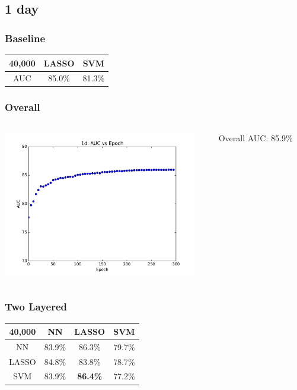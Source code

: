 \documentclass[table]{beamer}
\begin{document}

\subsection{1 day}

\begin{frame}
	\frametitle{Baseline}
	\begin{center}
		\begin{tabular}{c | c c}
			40,000 & LASSO & SVM \\ \hline
			AUC & 85.0\% & 81.3\% \\
		\end{tabular}
	\end{center}
\end{frame}

\begin{frame}
	\frametitle{Overall}
	\begin{columns}[c]
		\begin{column}{8cm}
			\includegraphics[width=8.5cm]{Images/NNplots/1d.pdf}
		\end{column}
		\begin{column}{4cm}
			Overall AUC: 85.9\%
		\end{column}
		
	\end{columns}
\end{frame}

\begin{frame}
	\frametitle{Two Layered}
	\begin{center}
		\begin{tabular}{c | c c c}
			40,000 & NN & LASSO & SVM \\ \hline
			NN & 83.9\% & 86.3\% & 79.7\% \\
			LASSO & 84.8\% & 83.8\% & 78.7\% \\
			SVM & 83.9\% & \textbf{86.4\%} & 77.2\%
		\end{tabular}
	
	\end{center}
\end{frame}
\end{document}
